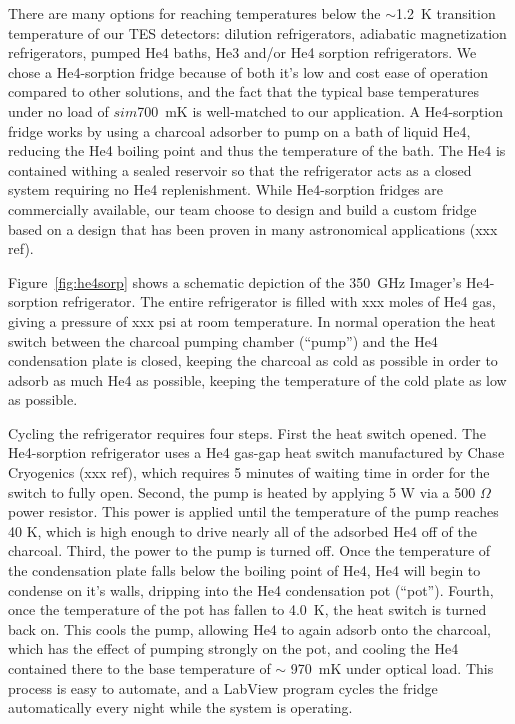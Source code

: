 \documentclass[10pt,twocolumn,article]{memoir} %
\newcommand{\figref}[1]{Figure~\ref{#1}}
\newcommand{\TES}{{\small TES}\xspace}
\newcommand{\He}[1]{He#1\xspace}
\newcommand{\Ohm}{\ensuremath{\Omega}\xspace}
\begin{document}
There are many options for reaching temperatures below the $\sim$1.2~K transition temperature of our \TES detectors: dilution refrigerators, adiabatic magnetization refrigerators, pumped \He4 baths, \He3 and/or \He4 sorption refrigerators.
We chose a \He4-sorption fridge because of both it's low and cost ease of operation compared to other solutions, and the fact that the typical base temperatures under no load of $sim$700~mK is well-matched to our application.
A  \He4-sorption fridge works by using a charcoal adsorber to pump on a bath of liquid \He4, reducing the \He4 boiling point and thus the temperature of the bath.
The \He4 is contained withing a sealed reservoir so that the refrigerator acts as a closed system requiring no \He4 replenishment. 
While \He4-sorption fridges are commercially available, our team choose to design and build a custom fridge based on a design that has been proven in many astronomical applications (xxx ref).

\figref{fig:he4sorp} shows a schematic depiction of the 350~GHz Imager's \He4-sorption refrigerator.
The entire refrigerator is filled with xxx moles of \He4 gas, giving a pressure of xxx psi at room temperature.
In normal operation the heat switch between the charcoal pumping chamber (``pump'') and the \He4 condensation plate is closed, keeping the charcoal as cold as possible in order to adsorb as much \He4 as possible, keeping the temperature of the cold plate as low as possible.

Cycling the refrigerator requires four steps. First the heat switch opened.
The \He4-sorption refrigerator uses a \He4 gas-gap heat switch manufactured by Chase Cryogenics (xxx ref), which requires 5 minutes of waiting time in order for the switch to fully open.
Second, the pump is heated by applying 5 W via a 500 \Ohm power resistor.
This power is applied until the temperature of the pump reaches 40 K, which is high enough to drive nearly all of the adsorbed \He4 off of the charcoal.
Third, the power to the pump is turned off.
Once the temperature of the condensation plate falls below the boiling point of \He4, \He4 will begin to condense on it's walls, dripping into the \He4 condensation pot (``pot'').
Fourth, once the temperature of the pot has fallen to 4.0~K, the heat switch is turned back on.
This cools the pump, allowing \He4 to again adsorb onto the charcoal, which has the effect of pumping strongly on the pot, and cooling the \He4 contained there to the base temperature of $\sim$ 970~mK under optical load.
This process is easy to automate, and a LabView program cycles the fridge automatically every night while the system is operating.
\end{document}
